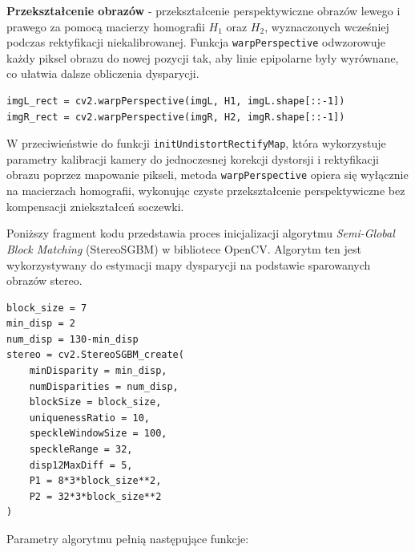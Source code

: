 \documentclass[magisterska]{pracadypl}
\begin{document}
\textbf{Przekształcenie obrazów} - przekształcenie perspektywiczne obrazów lewego i prawego za pomocą macierzy homografii $H_1$ oraz $H_2$, wyznaczonych wcześniej podczas rektyfikacji niekalibrowanej. Funkcja \texttt{warpPerspective} odwzorowuje każdy piksel obrazu do nowej pozycji tak, aby linie epipolarne były wyrównane, co ułatwia dalsze obliczenia dysparycji.

\begin{lstlisting}[style=mypython]
imgL_rect = cv2.warpPerspective(imgL, H1, imgL.shape[::-1])
imgR_rect = cv2.warpPerspective(imgR, H2, imgR.shape[::-1])
\end{lstlisting}

W przeciwieństwie do funkcji \texttt{initUndistortRectifyMap}, która wykorzystuje parametry kalibracji kamery do jednoczesnej korekcji dystorsji i rektyfikacji obrazu poprzez mapowanie pikseli, metoda \texttt{warpPerspective} opiera się wyłącznie na macierzach homografii, wykonując czyste przekształcenie perspektywiczne bez kompensacji zniekształceń soczewki.

Poniższy fragment kodu przedstawia proces inicjalizacji algorytmu \textit{Semi-Global Block Matching} (StereoSGBM) w bibliotece OpenCV.  
Algorytm ten jest wykorzystywany do estymacji mapy dysparycji na podstawie sparowanych obrazów stereo.  

\begin{lstlisting}[style=mypython]
block_size = 7
min_disp = 2
num_disp = 130-min_disp
stereo = cv2.StereoSGBM_create(
    minDisparity = min_disp,
    numDisparities = num_disp,
    blockSize = block_size,
    uniquenessRatio = 10,
    speckleWindowSize = 100,
    speckleRange = 32,
    disp12MaxDiff = 5,
    P1 = 8*3*block_size**2,
    P2 = 32*3*block_size**2
)
\end{lstlisting}

Parametry algorytmu pełnią następujące funkcje:
\end{document}
